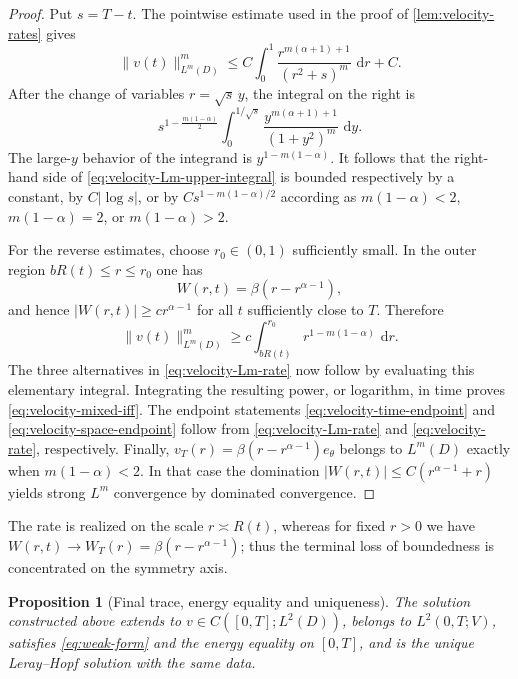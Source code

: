 \documentclass[10pt]{amsart}
\newtheorem{proposition}[theorem]{Proposition}
\theoremstyle{definition}
\newcommand{\dd}{\,\mathrm d}
\begin{document}
\begin{proof}
Put $s=T-t$.  The pointwise estimate used in the proof of
\cref{lem:velocity-rates} gives
\begin{equation}
\label{eq:velocity-Lm-upper-integral}
    \|v(t)\|_{L^m(D)}^m
    \leq C\int_0^1
       \frac{r^{m(\alpha+1)+1}}{(r^2+s)^m}\,\dd r+C.
\end{equation}
After the change of variables $r=\sqrt{s}\,y$, the integral on the right is
\[
    s^{1-\frac{m(1-\alpha)}2}
    \int_0^{1/\sqrt{s}}
       \frac{y^{m(\alpha+1)+1}}{(1+y^2)^m}\,\dd y.
\]
The large-$y$ behavior of the integrand is
$y^{1-m(1-\alpha)}$.  It follows that the right-hand side of
\eqref{eq:velocity-Lm-upper-integral} is bounded respectively by a constant,
by $C|\log s|$, or by $Cs^{1-m(1-\alpha)/2}$ according as
$m(1-\alpha)<2$, $m(1-\alpha)=2$, or $m(1-\alpha)>2$.

For the reverse estimates, choose $r_0\in(0,1)$ sufficiently small.  In the
outer region $bR(t)\leq r\leq r_0$ one has
\[
    W(r,t)=\beta(r-r^{\alpha-1}),
\]
and hence $|W(r,t)|\geq c r^{\alpha-1}$ for all $t$ sufficiently close to
$T$.  Therefore
\[
    \|v(t)\|_{L^m(D)}^m
    \geq c\int_{bR(t)}^{r_0}r^{1-m(1-\alpha)}\,\dd r.
\]
The three alternatives in \eqref{eq:velocity-Lm-rate} now follow by evaluating
this elementary integral.  Integrating the resulting power, or logarithm, in
time proves \eqref{eq:velocity-mixed-iff}.  The endpoint statements
\eqref{eq:velocity-time-endpoint} and \eqref{eq:velocity-space-endpoint} follow
from \eqref{eq:velocity-Lm-rate} and \eqref{eq:velocity-rate}, respectively.
Finally, $v_T(r)=\beta(r-r^{\alpha-1})e_\theta$ belongs to $L^m(D)$ exactly
when $m(1-\alpha)<2$.  In that case the domination
$|W(r,t)|\leq C(r^{\alpha-1}+r)$ yields strong $L^m$ convergence by dominated
convergence.
\end{proof}

The rate is realized on the scale $r\asymp R(t)$, whereas for fixed $r>0$
we have $W(r,t)\to W_T(r)=\beta(r-r^{\alpha-1})$; thus the terminal loss of
boundedness is concentrated on the symmetry axis.

\begin{proposition}[Final trace, energy equality and uniqueness]
\label{prop:extension}
The solution constructed above extends to $v\in C([0,T];L^2(D))$, belongs to
$L^2(0,T;V)$, satisfies \eqref{eq:weak-form} and the energy equality on
$[0,T]$, and is the unique Leray--Hopf solution with the same data.
\end{proposition}
\end{document}
